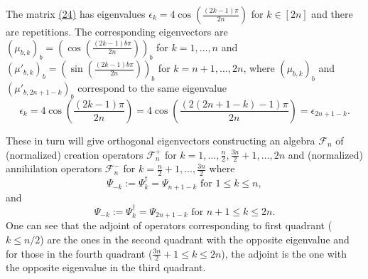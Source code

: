 \documentclass[twoside,11pt,titlepage]{amsart}
\renewcommand{\=}[1]{\stackrel{#1}{=}} %
\theoremstyle{definition}
\theoremstyle{remark}
\begin{document}
The matrix \hyperref[eq24]{(24)} has eigenvalues $\epsilon_k=4\cos(\frac{(2k-1)\pi}{2n})$ for $k \in [2n]$ and there are repetitions. The corresponding eigenvectors are $(\mu_{b,k})_b=(\cos(\frac{(2k-1)b\pi}{2n}))_b$ for $k=1,\ldots,n$ and $(\mu'_{b,k})_b=(\sin(\frac{(2k-1)b\pi}{2n}))_b$ for $k=n+1,\ldots,2n$, where $(\mu_{b,k})_b$ and $(\mu'_{b,2n+1-k})_b$ correspond to the same eigenvalue $$\epsilon_k=4\cos(\frac{(2k-1)\pi}{2n})=4\cos(\frac{(2(2n+1-k)-1)\pi}{2n})=\epsilon_{2n+1-k}.$$

These in turn will give orthogonal eigenvectors constructing an algebra $\mathcal{F}_n$ of (normalized) creation operators $\mathcal{F}_n^+$ for $k = 1,\ldots,\frac{n}{2},\frac{3n}{2}+1,\ldots,2n$ and (normalized) annihilation operators $\mathcal{F}_n^-$ for $k = \frac{n}{2}+1,\ldots,\frac{3n}{2}$ where
$$\Psi_{-k}:=\Psi_{k}^\dagger=\Psi_{n+1-k} \text{ for } 1 \le k \le n,$$
and
$$\Psi_{-k}:=\Psi_{k}^\dagger=\Psi_{2n+1-k} \text{ for } n+1 \le k \le 2n.$$
One can see that the adjoint of operators corresponding to first quadrant ($k \le n/2$) are the ones in the second quadrant with the opposite eigenvalue and for those in the fourth quadrant ($\frac{3n}{2}+1 \le k \le 2n$), the adjoint is the one with the opposite eigenvalue in the third quadrant. 
\end{document}
